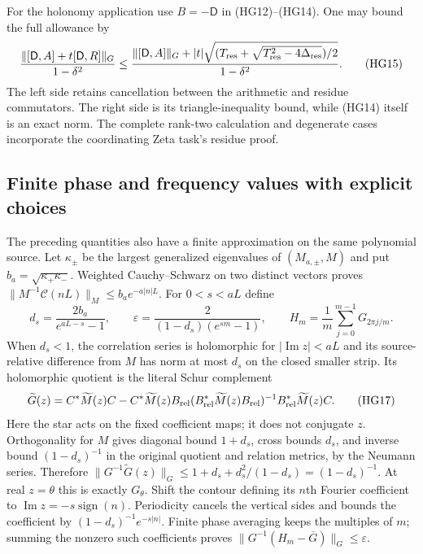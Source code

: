 \documentclass{article}
\begin{document}
For the holonomy application use $B=-\mathsf D$ in (HG12)--(HG14).
One may bound the full allowance by
\[
 \frac{\|[\mathsf D,A]+t[\mathsf D,R]\|_G}{1-\delta^2}
 \le\frac{\|[\mathsf D,A]\|_G+
 |t|\sqrt{(T_{\rm res}+
 \sqrt{T_{\rm res}^2-4\Delta_{\rm res}})/2}}{1-\delta^2}.
 \tag{HG15}
\]
The left side retains cancellation between the arithmetic and residue
commutators. The right side is its triangle-inequality bound, while
(HG14) itself is an exact norm. The complete rank-two calculation and
degenerate cases incorporate the coordinating Zeta task's residue proof.

\subsection{Finite phase and frequency values with explicit choices}

The preceding quantities also have a finite approximation on the same
polynomial source. Let $\kappa_\pm$ be the largest generalized
eigenvalues of $(M_{a,\pm},M)$ and put
$b_a=\sqrt{\kappa_+\kappa_-}$. Weighted Cauchy--Schwarz on two
distinct vectors proves
$\|M^{-1}\mathcal C(nL)\|_M\le b_a e^{-a|n|L}$.
For $0<s<aL$ define
\[
 d_s=\frac{2b_a}{e^{aL-s}-1},\qquad
 \varepsilon=\frac{2}{(1-d_s)(e^{sm}-1)},\qquad
 H_m=\frac1m\sum_{j=0}^{m-1}G_{2\pi j/m} .
 \tag{HG16}
\]
When $d_s<1$, the correlation series is holomorphic for
$|\operatorname{Im}z|<aL$ and its source-relative difference from
$M$ has norm at most $d_s$ on the closed smaller strip. Its
holomorphic quotient is the literal Schur complement
\[
 \widetilde G(z)=C^*\widetilde M(z)C-
 C^*\widetilde M(z)B_{\rm rel}
 (B_{\rm rel}^*\widetilde M(z)B_{\rm rel})^{-1}
 B_{\rm rel}^*\widetilde M(z)C .
 \tag{HG17}
\]
Here the star acts on the fixed coefficient maps; it does not conjugate
$z$. Orthogonality for $M$ gives diagonal bound $1+d_s$, cross bounds
$d_s$, and inverse bound $(1-d_s)^{-1}$ in the original quotient and
relation metrics, by the Neumann series. Therefore
$\|G^{-1}\widetilde G(z)\|_G\le
1+d_s+d_s^2/(1-d_s)=(1-d_s)^{-1}$.
At real $z=\theta$ this is exactly $G_\theta$.
Shift the contour defining its $n$th Fourier coefficient to
$\operatorname{Im}z=-s\operatorname{sign}(n)$. Periodicity cancels
the vertical sides and bounds the coefficient by
$(1-d_s)^{-1}e^{-s|n|}$. Finite phase averaging keeps the multiples
of $m$; summing the nonzero such coefficients proves
$\|G^{-1}(H_m-\overline G)\|_G\le\varepsilon$.
\end{document}

